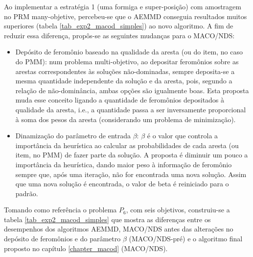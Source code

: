 Ao implementar a estratégia 1 (uma formiga e super-posição) com amostragem no PRM many-objetive, percebeu-se que o AEMMD conseguia resultados muitos superiores (tabela \ref{tab_exp2_macod_simples}) ao novo algoritmo. A fim de reduzir essa diferença, propôs-se as seguintes mudanças para o MACO/NDS:

\begin{itemize}
	\item Depósito de feromônio baseado na qualidade da aresta (ou do item, no caso do PMM): num problema multi-objetivo, ao depositar feromônios sobre as arestas correspondentes às soluções não-dominadas, sempre deposita-se a mesma quantidade independente da solução e da aresta, pois, segundo a relação de não-dominância, ambas opções são igualmente boas. Esta proposta muda esse conceito ligando a quantidade de feromônios depositados à qualidade da aresta, i.e., a quantidade passa a ser inversamente proporcional à soma dos pesos da aresta (considerando um problema de minimização).
	\item Dinamização do parâmetro de entrada $\beta$: $\beta$ é o valor que controla a importância da heurística ao calcular as probabilidades de cada aresta (ou item, no PMM) de fazer parte da solução. A proposta é diminuir um pouco a importância da heurística, dando maior peso à informação de feromônio sempre que, após uma iteração, não for encontrada uma nova solução. Assim que uma nova solução é encontrada, o valor de beta é reiniciado para o padrão.
\end{itemize}

Tomando como referência o problema $P_6$, com seis objetivos, construiu-se a tabela \ref{tab_exp2_macod_simples} que mostra as diferenças entre os desempenhos dos algoritmos AEMMD, MACO/NDS antes das alterações no depósito de feromônios e do parâmetro $\beta$ (MACO/NDS-pré) e o algoritmo final proposto no capítulo \ref{chapter_macod} (MACO/NDS).

